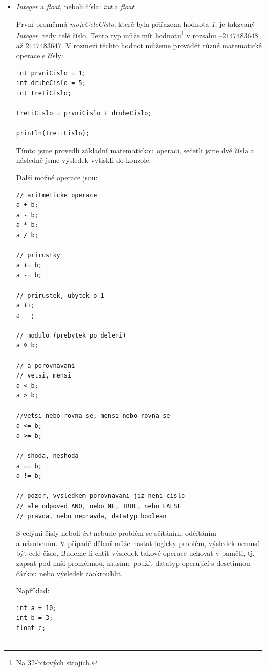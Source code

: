 \documentclass[10pt,twoside=true,open=right,cleardoublepage=empty,chapterprefix=true]{scrbook}
\begin{document}
\begin{itemize}


\item{{\em Integer} a {\em float}, neboli čísla: {\em int} a {\em float}}

První proměnná {\em mojeCeleCislo}, které byla přiřazena hodnota {\em 1}, je takzvaný {\em Integer}, tedy celé číslo. Tento typ může mít hodnotu\footnote{Na 32-bitových strojích.} v rozsahu $–2147483648$ až $2147483647$. V rozmezí těchto hodnot můžeme provádět různé matematické operace s čísly:

\begin{lstlisting}
int prvniCislo = 1;
int druheCislo = 5;
int tretiCislo;

tretiCislo = prvniCislo + druheCislo;

println(tretiCislo);
\end{lstlisting}

Tímto jsme provedli základní matematickou operaci, sečetli jsme dvě čísla a následně jsme výsledek vytiskli do konzole.

Další možné operace jsou:

\begin{lstlisting}
// aritmeticke operace
a + b;
a - b;
a * b;
a / b;

// prirustky
a += b;
a -= b;

// prirustek, ubytek o 1
a ++;
a --;

// modulo (prebytek po deleni)
a % b;

// a porovnavani
// vetsi, mensi
a < b;
a > b;

//vetsi nebo rovna se, mensi nebo rovna se
a <= b;
a >= b;

// shoda, neshoda
a == b;
a != b;

// pozor, vysledkem porovnavani jiz neni cislo
// ale odpoved ANO, nebo NE, TRUE, nebo FALSE
// pravda, nebo nepravda, datatyp boolean

\end{lstlisting}

S celými čísly neboli {\em int} nebude problém se sčítáním, odčítáním \\a násobením. V případě dělení může nastat logicky problém, výsledek nemusí být celé číslo. Budeme-li chtít výsledek takové operace uchovat v paměti, tj. zapsat pod naši proměnnou, musíme použít datatyp operující s desetinnou čárkou nebo výsledek zaokrouhlit.

Například:

\begin{lstlisting}
int a = 10;
int b = 3;
float c;


\end{lstlisting}
\end{itemize}
\end{document}
